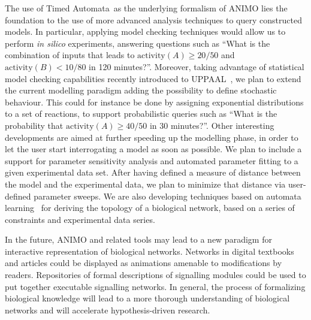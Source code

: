 \documentclass[journal, 10pt]{IEEEtran}
\def\tas{Timed Automata}
\begin{document}
The use of \tas\ as the underlying formalism of ANIMO lies the foundation to the use of more advanced 
analysis techniques to query constructed models. In particular, applying model checking techniques would allow us to perform \emph{in silico} experiments, answering questions
such as ``What is the combination of inputs that leads to $\mbox{activity}(A) \geq 20/50$
and $\mbox{activity}(B) < 10/80$ in 120 minutes?''. Moreover, taking advantage of statistical model
checking capabilities recently introduced to UPPAAL~\cite{uppaal-smc}, we plan to extend the current modelling paradigm adding the possibility
to define stochastic behaviour. This could for instance be done by assigning exponential distributions to a set of reactions,
to support probabilistic queries such as ``What is the probability that
$\mbox{activity}(A) \geq 40/50$ in 30 minutes?''.
Other interesting developments are aimed at further speeding up the modelling phase, in order to let the user
start interrogating a model as soon as possible. We plan to include a support for parameter
sensitivity analysis and automated parameter fitting to a given experimental data set. 
After having defined a measure of distance between the model and the experimental data, we plan to minimize that distance
via user-defined parameter sweeps.
We are also developing
techniques based on automata learning~\cite{test-based-modelling} for deriving the topology of a biological network, based
on a series of constraints and experimental data series.

In the future, ANIMO and related tools may lead to a new paradigm for interactive representation of
biological networks. Networks in digital textbooks and articles could be displayed as animations amenable to
modifications by readers. Repositories of formal descriptions of signalling modules could be used to put together
executable signalling networks. In general, the process of formalizing biological knowledge will lead
to a more thorough understanding of biological networks and will accelerate hypothesis-driven research.



\end{document}
